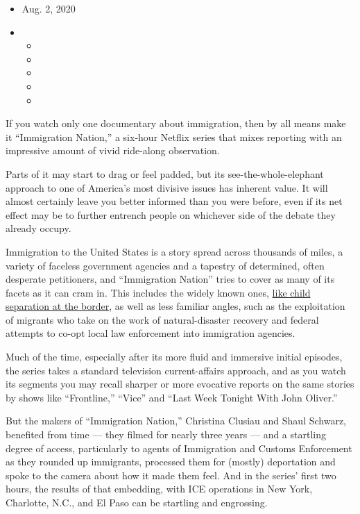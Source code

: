 \begin{itemize}
\item
  Aug. 2, 2020
\item
  \begin{itemize}
  \item
  \item
  \item
  \item
  \item
  \end{itemize}
\end{itemize}

If you watch only one documentary about immigration, then by all means
make it ``Immigration Nation,'' a six-hour Netflix series that mixes
reporting with an impressive amount of vivid ride-along observation.

Parts of it may start to drag or feel padded, but its
see-the-whole-elephant approach to one of America's most divisive issues
has inherent value. It will almost certainly leave you better informed
than you were before, even if its net effect may be to further entrench
people on whichever side of the debate they already occupy.

Immigration to the United States is a story spread across thousands of
miles, a variety of faceless government agencies and a tapestry of
determined, often desperate petitioners, and ``Immigration Nation''
tries to cover as many of its facets as it can cram in. This includes
the widely known ones,
\href{https://www.nytimes.com/2019/03/09/us/migrant-family-separations-border.html}{like
child separation at the border}, as well as less familiar angles, such
as the exploitation of migrants who take on the work of natural-disaster
recovery and federal attempts to co-opt local law enforcement into
immigration agencies.

Much of the time, especially after its more fluid and immersive initial
episodes, the series takes a standard television current-affairs
approach, and as you watch its segments you may recall sharper or more
evocative reports on the same stories by shows like ``Frontline,''
``Vice'' and ``Last Week Tonight With John Oliver.''

But the makers of ``Immigration Nation,'' Christina Clusiau and Shaul
Schwarz, benefited from time --- they filmed for nearly three years ---
and a startling degree of access, particularly to agents of Immigration
and Customs Enforcement as they rounded up immigrants, processed them
for (mostly) deportation and spoke to the camera about how it made them
feel. And in the series' first two hours, the results of that embedding,
with ICE operations in New York, Charlotte, N.C., and El Paso can be
startling and engrossing.

